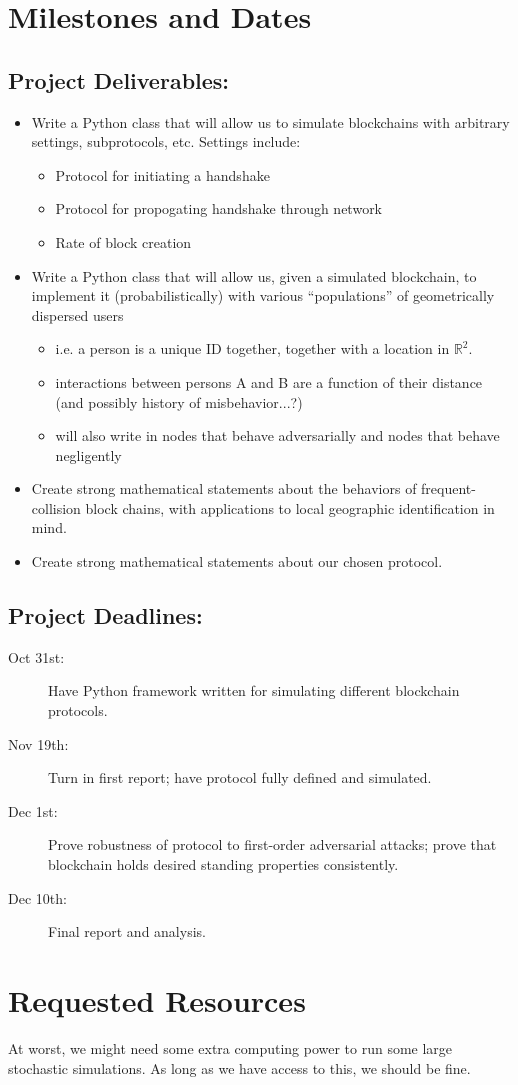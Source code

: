 \documentclass{article}
\begin{document}
\section*{Milestones and Dates}
\subsection*{Project Deliverables:}
\begin{itemize}
	\item Write a Python class that will allow us to simulate
		blockchains with arbitrary settings, subprotocols, etc.
		Settings include:
	\begin{itemize}
		\item Protocol for initiating a handshake
		\item Protocol for propogating handshake through network
		\item Rate of block creation
	\end{itemize}
	\item Write a Python class that will allow us, given a simulated
		blockchain, to implement it (probabilistically) with
		various ``populations'' of geometrically dispersed users
	\begin{itemize}
		\item i.e. a person is a unique ID together,
			together with a location in $\mathbb{R}^2$.
		\item interactions between persons A and B are
			a function of their distance (and possibly
			history of misbehavior...?)
		\item will also write in nodes that behave adversarially
			and nodes that behave negligently
	\end{itemize}
	\item Create strong mathematical statements about
		the behaviors of frequent-collision block chains,
		with applications to local geographic identification
		in mind.
	\item Create strong mathematical statements about our chosen
		protocol.
\end{itemize}

\subsection*{Project Deadlines:}
\begin{description}
	\item[Oct 31st:] Have Python framework written for simulating different
		blockchain protocols.
	\item[Nov 19th:] Turn in first report; have protocol fully defined and
		simulated.
	\item[Dec 1st:] Prove robustness of protocol to first-order adversarial
		attacks; prove that blockchain holds desired standing properties
		consistently.
	\item[Dec 10th:] Final report and analysis.
\end{description}

\section*{Requested Resources}
At worst, we might need some extra computing power to run some large stochastic
simulations. As long as we have access to this, we should be fine.
\end{document}
